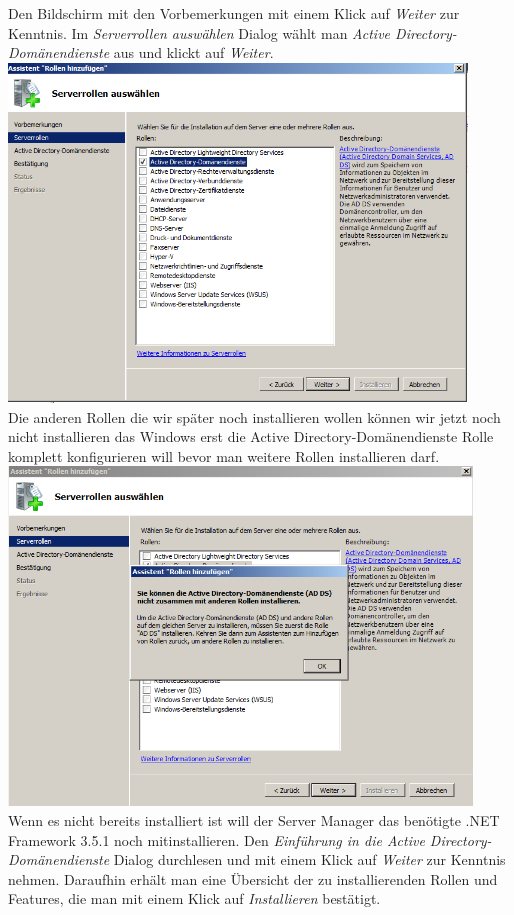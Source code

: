 \documentclass[12pt,a4paper,titlepage]{article} %
\begin{document}
Den Bildschirm mit den Vorbemerkungen mit einem Klick auf \emph{Weiter} zur Kenntnis. Im \emph{Serverrollen auswählen} Dialog wählt man \emph{Active Directory-Domänendienste} aus und klickt auf \emph{Weiter}.\\

	\includegraphics[height=9cm]{Bilder/008}\\
	
Die anderen Rollen die wir später noch installieren wollen können wir jetzt noch nicht installieren das Windows erst die Active Directory-Domänendienste Rolle komplett konfigurieren will bevor man weitere Rollen installieren darf.\\
 
 	\includegraphics[height=9cm]{Bilder/009}\\
 	
Wenn es nicht bereits installiert ist will der Server Manager das benötigte .NET Framework 3.5.1 noch mitinstallieren. Den \emph{Einführung in die Active Directory-Domänendienste} Dialog durchlesen und mit einem Klick auf \emph{Weiter} zur Kenntnis nehmen. Daraufhin erhält man eine Übersicht der zu installierenden Rollen und Features, die man mit einem Klick auf \emph{Installieren} bestätigt.\\
\end{document}
